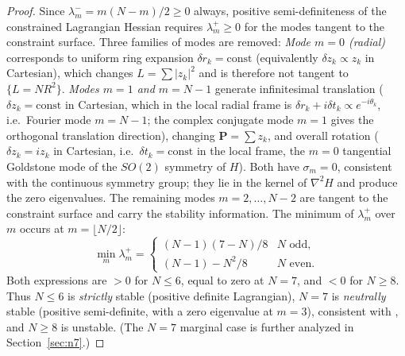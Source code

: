 \begin{proof}
Since $\lambda_m^- = m(N{-}m)/2 \ge 0$ always, positive
semi-definiteness of the constrained Lagrangian Hessian requires
$\lambda_m^+ \ge 0$ for the modes tangent to the constraint surface.
Three families of modes are removed:
\emph{Mode $m = 0$ (radial)} corresponds to uniform ring expansion
$\delta r_k = \mathrm{const}$ (equivalently $\delta z_k \propto z_k$
in Cartesian), which changes $L = \sum|z_k|^2$ and is therefore not
tangent to $\{L = NR^2\}$.
\emph{Modes $m = 1$ and $m = N-1$} generate infinitesimal translation
($\delta z_k = \mathrm{const}$ in Cartesian, which in the local
radial frame is $\delta r_k + i\delta t_k \propto e^{-i\theta_k}$,
i.e.\ Fourier mode $m = N-1$; the complex conjugate mode $m = 1$
gives the orthogonal translation direction), changing
$\mathbf{P} = \sum z_k$, and
overall rotation ($\delta z_k = iz_k$ in Cartesian, i.e.\
$\delta t_k = \mathrm{const}$ in the local frame, the $m = 0$
tangential Goldstone mode of the $SO(2)$
symmetry of $H$).  Both have $\sigma_m = 0$, consistent with the
continuous symmetry group; they lie in the kernel of $\nabla^2 H$ and
produce the zero eigenvalues.
The remaining modes $m = 2, \ldots, N-2$ are tangent to the constraint
surface and carry the stability information.  The minimum of
$\lambda_m^+$ over $m$ occurs at $m = \lfloor N/2 \rfloor$:
\[
  \min_m \lambda_m^+ = \begin{cases}
    (N{-}1)(7{-}N)/8 & N \text{ odd}, \\
    (N{-}1) - N^2/8 & N \text{ even}.
  \end{cases}
\]
Both expressions are $> 0$ for $N \le 6$, equal to zero at $N = 7$,
and $< 0$ for $N \ge 8$.  Thus $N \le 6$ is \emph{strictly} stable
(positive definite Lagrangian), $N = 7$ is \emph{neutrally} stable
(positive semi-definite, with a zero eigenvalue at $m = 3$),
consistent with \citet{Havelock1931}, and $N \ge 8$ is unstable.
(The $N = 7$ marginal case is further analyzed in
Section~\ref{sec:n7}.)
\end{proof}
